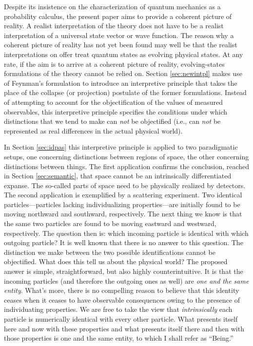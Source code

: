 Despite its insistence on the characterization of quantum mechanics as a probability calculus, the present paper aims to provide a coherent picture of reality. A realist interpretation of the theory does not have to be a realist interpretation of a universal state vector or wave function. The reason why a coherent picture of reality has not yet been found may well be that the realist interpretations on offer treat quantum states as evolving physical states. At any rate, if the aim is to arrive at a coherent picture of reality, evolving-states formulations of the theory cannot be relied on. Section \ref{sec:newintpl} makes use of Feynman's formulation \citep{FHS} to introduce an interpretive principle that takes the place of the collapse (or projection) postulate of the former formulations. Instead of attempting to account for the objectification of the values of measured observables, this interpretive principle specifies the conditions under which distinctions that we tend to make can \emph{not} be objectified (i.e., can \emph{not} be represented as real differences in the actual physical world).

In Section \ref{sec:idpas} this interpretive principle is applied to two paradigmatic setups, one concerning distinctions between regions of space, the other concerning distinctions between things. The first application confirms the conclusion, reached in Section \ref{sec:semantic}, that space cannot be an intrinsically differentiated expanse. The so-called parts of space need to be physically realized by detectors. The second application is exemplified by a scattering experiment. Two identical particles---particles lacking individualizing properties---are initially found to be moving northward and southward, respectively. The next thing we know is that the same two particles are found to be moving eastward and westward, respectively. The question then is: which incoming particle is identical with which outgoing particle? It  is well known that there is no answer to this question. The distinction we make between the two possible identifications cannot be objectified. What does this tell us about the physical world? The proposed answer is simple, straightforward, but also highly counterintuitive. It is that the incoming particles (and therefore the outgoing ones as well) are \emph{one and the same entity}. What's more, there is no compelling reason to believe that this identity ceases when it ceases to have observable consequences owing to the presence of individuating properties.  We are free to take the view that \emph{intrinsically} each particle is numerically identical with every other particle. What presents itself here and now with these properties and what presents itself there and then with those properties is one and the same entity, to which I shall refer as ``Being.''

